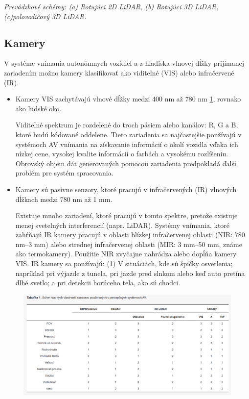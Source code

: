 \documentclass[10pt,oneside,slovak,a4paper]{article}
\begin{document}
\begin{center}
\centering
{
\emph{Prevádzkové schémy: (a) Rotujúci 2D LiDAR, (b) Rotujúci 3D LiDAR, 
(c)polovodičový 3D LiDAR\cite{s19030648}.}
}
\end{center}


\subsection{Kamery}
V systéme vnímania autonómnych vozidiel a z hľadiska vlnovej dĺžky prijímanej zariadením možno kamery klasifikovať ako viditeľné (VIS) alebo infračervené (IR). \cite{s19030648}

\begin{itemize}
\item Kamery VIS zachytávajú vlnové dĺžky medzi 400 nm až 780 nm \ref{fig:tabulka}, rovnako ako ľudské oko. \par Viditeľné spektrum je rozdelené do troch pásiem alebo kanálov: R, G a B, ktoré budú kódované oddelene. Tieto zariadenia sa najčastejšie používajú v systémoch AV vnímania na získavanie informácií o okolí vozidla vďaka ich nízkej cene, vysokej kvalite informácií o farbách a vysokému rozlíšeniu. Obrovský objem dát generovaných pomocou zariadenia predpokladá ďalší problém pre systém spracovania.

\item Kamery sú pasívne senzory, ktoré pracujú v infračervených (IR) vlnových dĺžkach medzi 780 nm až 1 mm.\par Existuje mnoho zariadení, ktoré pracujú v tomto spektre, pretože existuje menej svetelných interferencií (napr. LiDAR). Systémy vnímania, ktoré zahŕňajú IR kamery\cite{gade2014thermal,olmeda2011far}  pracujú v oblasti blízkej infračervenej oblasti (NIR: 780 nm–3 mm) alebo strednej infračervenej oblasti (MIR: 3 mm–50 mm, známe ako termokamery). Použitie NIR zvyčajne nahrádza alebo dopĺňa kamery VIS. IR kamery sa používajú: (1) V situáciách, kde sú špičky osvetlenia; napríklad pri výjazde z tunela, pri jazde pred slnkom alebo keď auto pretína dlhé svetlo; a pri detekcii horúceho tela, ako sú chodci. \cite{gonzalez2016pedestrian,sun2011night,john2015pedestrian}
\end{itemize}

\newpage

\begin{figure}[!h]
\centering
\includegraphics[scale=0.5]{tabulka.png}
\label{fig:tabulka}
\end{figure}
\end{document}
